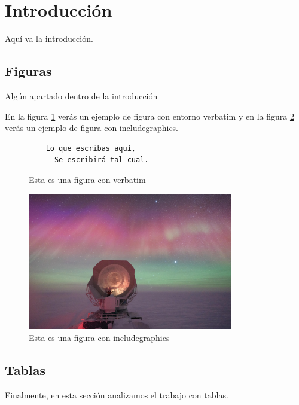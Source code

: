 \documentclass[12pt]{article} %
\title{}
\author{Suárez Saldaña, Jorge Alberto \\ Matrícula: 355992}
\date{\today}
\begin{document}
\maketitle

\section{Introducción}
Aquí va la introducción.

\subsection{Figuras}
Algún apartado dentro de la introducción

En la figura \ref{fig:EjemploFigVerb} verás un ejemplo de figura con entorno verbatim 
y en la figura \ref{fig:EjemploFigGraph} verás un ejemplo de figura con includegraphics.

\begin{figure}[H]
  \centering
  \caption{Esta es una figura con verbatim}
  \label{fig:EjemploFigVerb}
  \begin{verbatim}
    Lo que escribas aquí,
      Se escribirá tal cual.
  \end{verbatim}
\end{figure}

\begin{figure}[H]
  \centering
  \caption{Esta es una figura con includegraphics}
  \label{fig:EjemploFigGraph}
  \includegraphics[width=0.8\textwidth]{imagen.jpeg}
\end{figure}

\subsection{Tablas}
Finalmente, en esta sección analizamos el trabajo con tablas.
\end{document}
